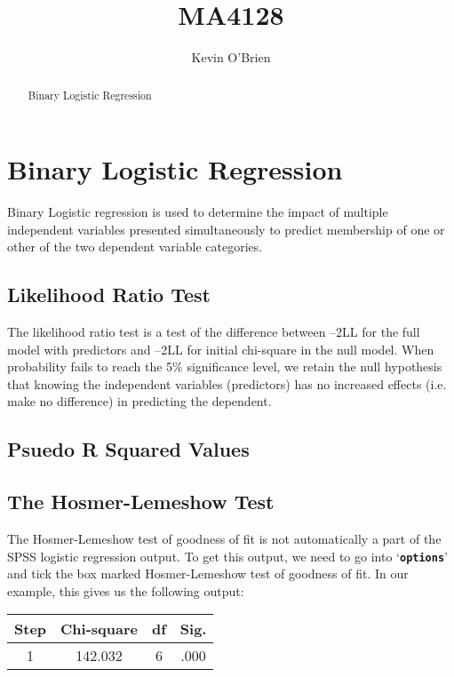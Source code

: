 \documentclass[12pt]{article}
\title{MA4128}
\author{Kevin O'Brien}
\begin{document}
\maketitle

\begin{abstract}
Binary Logistic Regression
\end{abstract}

\section{Binary Logistic Regression}
Binary Logistic regression is used to determine the impact of multiple independent variables
presented simultaneously to predict membership of one or other of the two
dependent variable categories.

\subsection{Likelihood Ratio Test}
The likelihood ratio test is a test of the difference between –2LL for the full
model with predictors and –2LL for initial chi-square in the null model.
When probability fails to reach the 5\% significance level, we retain the null hypothesis
that knowing the independent variables (predictors) has no increased effects (i.e. make no
difference) in predicting the dependent.

\subsection{Psuedo R Squared Values}


\subsection{The Hosmer-Lemeshow Test}

The Hosmer-Lemeshow test of goodness of fit is not automatically a part of the SPSS logistic regression output. To get this output, we need to go into `\textbf{\texttt{options}}’ and tick the box marked Hosmer-Lemeshow test of goodness of fit. In our example, this gives us the following output:

\begin{tabular}{|c|c|c|c|}
\hline  Step	& Chi-square&	df 	 & Sig. \\ \hline
 1	 & 142.032	& 6	 &.000 \\ 
\hline 
\end{tabular} 
\end{document}
